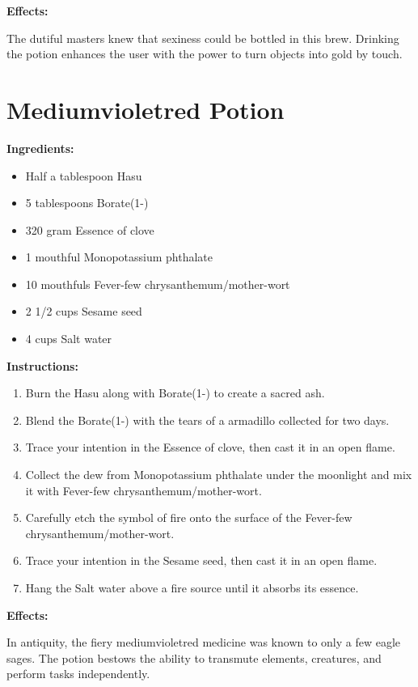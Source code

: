 \documentclass{article}
\begin{document}
\textbf{Effects:}

The dutiful masters knew that sexiness could be bottled in this brew. Drinking the potion enhances the user with the power to turn objects into gold by touch.

\newpage
\section*{Mediumvioletred Potion}

\textbf{Ingredients:}

\begin{itemize}
  \item Half a tablespoon Hasu
  \item 5 tablespoons Borate(1-)
  \item 320 gram Essence of clove
  \item 1 mouthful Monopotassium phthalate
  \item 10 mouthfuls Fever-few chrysanthemum/mother-wort
  \item 2 1/2 cups Sesame seed
  \item 4 cups Salt water
\end{itemize}

\textbf{Instructions:}

\begin{enumerate}
  \item Burn the Hasu along with Borate(1-) to create a sacred ash.
  \item Blend the Borate(1-) with the tears of a armadillo collected for two days.
  \item Trace your intention in the Essence of clove, then cast it in an open flame.
  \item Collect the dew from Monopotassium phthalate under the moonlight and mix it with Fever-few chrysanthemum/mother-wort.
  \item Carefully etch the symbol of fire onto the surface of the Fever-few chrysanthemum/mother-wort.
  \item Trace your intention in the Sesame seed, then cast it in an open flame.
  \item Hang the Salt water above a fire source until it absorbs its essence.
\end{enumerate}

\textbf{Effects:}

In antiquity, the fiery mediumvioletred medicine was known to only a few eagle sages. The potion bestows the ability to transmute elements, creatures, and perform tasks independently.
\end{document}
